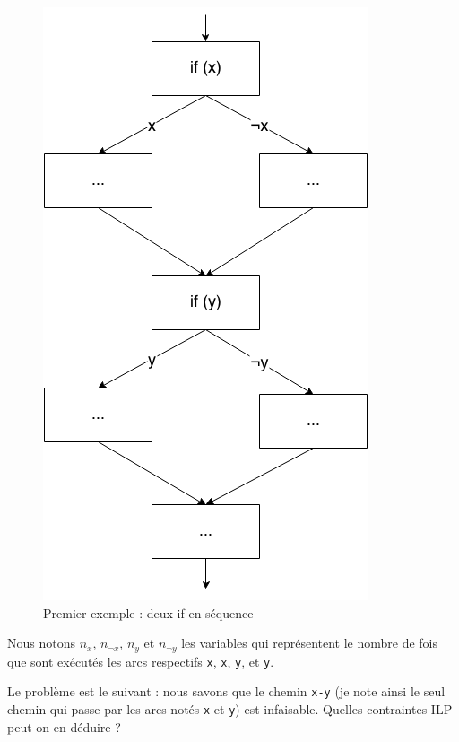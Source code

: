 \documentclass[french]{article}
\begin{document}
  
  \begin{figure}
    \centering
    \includegraphics[scale=0.4]{./pictures/if_2seq.png}
    \caption{Premier exemple : deux if en séquence}
    \label{if_2seq}
  \end{figure}
  
  Nous notons $n_x$, $n_{\neg x}$, $n_y$ et $n_{\neg y}$ les variables qui représentent le nombre de fois que sont exécutés les arcs respectifs \texttt{x}, \texttt{\textlnot x}, \texttt{y}, et \texttt{\textlnot y}.
  
  Le problème est le suivant : nous savons que le chemin \texttt{x-y} (je note ainsi le seul chemin qui passe par les arcs notés \texttt{x} et \texttt{y}) est infaisable. Quelles contraintes ILP peut-on en déduire ?
  
\end{document}
